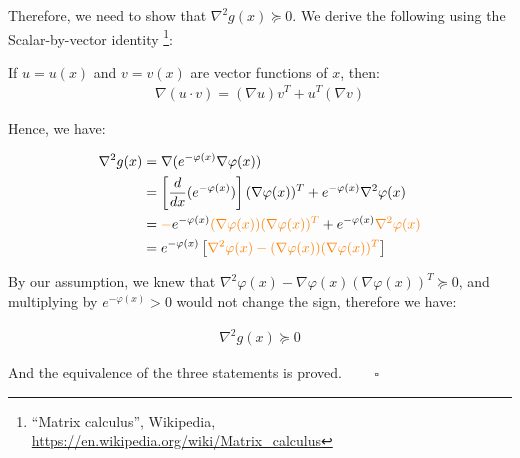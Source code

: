 \documentclass{article}
\begin{document}
Therefore, we need to show that $\nabla^2 g(x) \succeq 0$.
We derive the following using the Scalar-by-vector identity
\footnote{``Matrix calculus'', Wikipedia, \url{https://en.wikipedia.org/wiki/Matrix_calculus}}:
\bigskip

If $u = u(x)$ and $v = v(x)$ are vector functions of $x$, then:
\begin{align*}
    \nabla (u \cdot v) = (\nabla u) v^T + u^T (\nabla v)
\end{align*}

Hence, we have:

\begin{align*}
    \nabla^2 g(x) 
    &= \nabla(e^{-\varphi(x)} \nabla \varphi(x)) \\
    &= \left[ \frac{d}{dx}(e^{-\varphi(x)}) \right] (\nabla \varphi(x))^T + e^{-\varphi(x)} \nabla^2 \varphi(x) \\
    &= \textcolor{orange}{-} e^{-\varphi(x)} \textcolor{orange}{(\nabla \varphi(x))(\nabla \varphi(x))^T} + e^{-\varphi(x)} \textcolor{orange}{\nabla^2 \varphi(x)} \\
    &= e^{-\varphi(x)} \left[ \textcolor{orange}{\nabla^2 \varphi(x) - (\nabla \varphi(x))(\nabla \varphi(x))^T} \right]
\end{align*}

By our assumption, we knew that $\nabla^2 \varphi(x) - \nabla \varphi(x) (\nabla \varphi(x))^T \succeq 0$,
and multiplying by $e^{-\varphi(x)} > 0$ would not change the sign, therefore we have:

\begin{align*}
    \nabla^2 g(x) \succeq 0
\end{align*}

And the equivalence of the three statements is proved. $\qquad \square$
\end{document}
